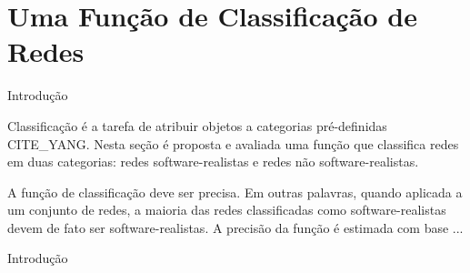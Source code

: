\chapter{Uma Função de Classificação de Redes} \label{cap:avaliacao}

\begin{section}{Introdução}

Classificação é a tarefa de atribuir objetos a categorias pré-definidas CITE_YANG. Nesta seção é proposta e avaliada uma função que classifica redes em duas categorias: redes software-realistas e redes não software-realistas. %

A função de classificação deve ser precisa. Em outras palavras, quando aplicada a um conjunto de redes, a maioria das redes classificadas como software-realistas devem de fato ser software-realistas. A precisão da função é estimada com base ...

\end{section}{Introdução}


